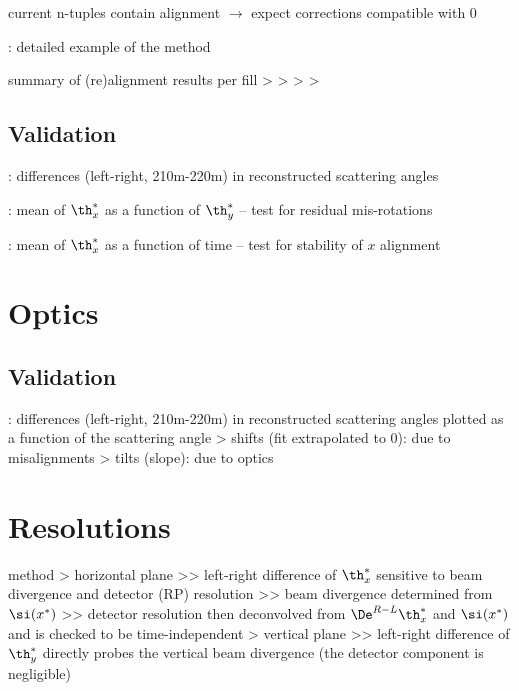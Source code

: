 \> current n-tuples contain alignment $\rightarrow$ expect corrections compatible with 0

\> : detailed example of the method

\> summary of (re)alignment results per fill
\>> 
\>> 
\>> 
\>> 


\subsection{Validation}

\> : differences (left-right, 210m-220m) in reconstructed scattering angles

\> : mean of $\th_x^*$ as a function of $\th_y^*$ -- test for residual mis-rotations

\> :  mean of $\th_x^*$ as a function of time -- test for stability of $x$ alignment



\section{Optics}

\subsection{Validation}

\> : differences (left-right, 210m-220m) in reconstructed scattering angles plotted as a function of the scattering angle
\>> shifts (fit extrapolated to 0): due to misalignments
\>> tilts (slope): due to optics



\section{Resolutions}

\> method
\>> horizontal plane
\>>> left-right difference of $\th_x^*$ sensitive to beam divergence and detector (RP) resolution
\>>> beam divergence determined from $\si(x^*)$
\>>> detector resolution then deconvolved from $\De^{R-L} \th_x^*$ and $\si(x^*)$ and is checked to be time-independent
\>> vertical plane
\>>> left-right difference of $\th_y^*$ directly probes the vertical beam divergence (the detector component is negligible)

